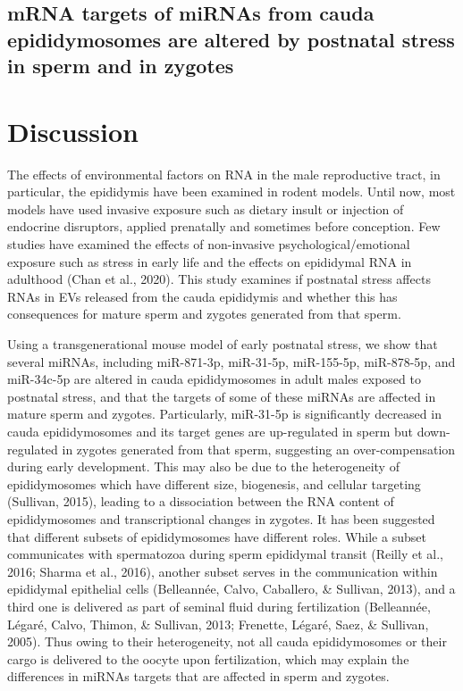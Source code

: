 \documentclass[12pt,twoside]{reedthesis}
\begin{document}
\hypertarget{mrna-targets-of-mirnas-from-cauda-epididymosomes-are-altered-by-postnatal-stress-in-sperm-and-in-zygotes}{%
\subsection{mRNA targets of miRNAs from cauda epididymosomes are altered by postnatal stress in sperm and in zygotes}\label{mrna-targets-of-mirnas-from-cauda-epididymosomes-are-altered-by-postnatal-stress-in-sperm-and-in-zygotes}}

\newpage

\hypertarget{discussion-1}{%
\section{Discussion}\label{discussion-1}}

The effects of environmental factors on RNA in the male reproductive tract, in particular, the epididymis have been examined in rodent models. Until now, most models have used invasive exposure such as dietary insult or injection of endocrine disruptors, applied prenatally and sometimes before conception. Few studies have examined the effects of non-invasive psychological/emotional exposure such as stress in early life and the effects on epididymal RNA in adulthood (Chan et al., 2020). This study examines if postnatal stress affects RNAs in EVs released from the cauda epididymis and whether this has consequences for mature sperm and zygotes generated from that sperm.

Using a transgenerational mouse model of early postnatal stress, we show that several miRNAs, including miR-871-3p, miR-31-5p, miR-155-5p, miR-878-5p, and miR-34c-5p are altered in cauda epididymosomes in adult males exposed to postnatal stress, and that the targets of some of these miRNAs are affected in mature sperm and zygotes. Particularly, miR-31-5p is significantly decreased in cauda epididymosomes and its target genes are up-regulated in sperm but down-regulated in zygotes generated from that sperm, suggesting an over-compensation during early development. This may also be due to the heterogeneity of epididymosomes which have different size, biogenesis, and cellular targeting (Sullivan, 2015), leading to a dissociation between the RNA content of epididymosomes and transcriptional changes in zygotes. It has been suggested that different subsets of epididymosomes have different roles. While a subset communicates with spermatozoa during sperm epididymal transit (Reilly et al., 2016; Sharma et al., 2016), another subset serves in the communication within epididymal epithelial cells (Belleannée, Calvo, Caballero, \& Sullivan, 2013), and a third one is delivered as part of seminal fluid during fertilization (Belleannée, Légaré, Calvo, Thimon, \& Sullivan, 2013; Frenette, Légaré, Saez, \& Sullivan, 2005). Thus owing to their heterogeneity, not all cauda epididymosomes or their cargo is delivered to the oocyte upon fertilization, which may explain the differences in miRNAs targets that are affected in sperm and zygotes.
\end{document}
